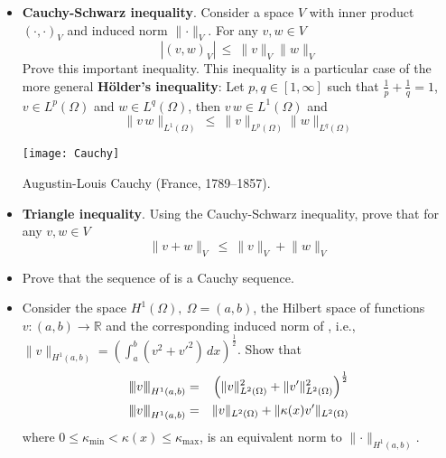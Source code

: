 \begin{kaobox}[frametitle=Solve the following exercices]
\begin{itemize}
\item \textbf{Cauchy-Schwarz inequality}. Consider a space $V$ with inner product 
$(\cdot,\cdot)_V$ and induced norm $\parallel \cdot \parallel_V$.
For any $v,w \in V$
\begin{equation}
|(v,w)_V| \, \le ~ \lVert v \rVert_V \lVert w \rVert_V
\end{equation}
Prove this important inequality. This inequality is a particular case
of the more general \textbf{H\"older's inequality}: Let $p,q \in [1,\infty]$
such that $\frac{1}{p} + \frac{1}{q} = 1$,
$v \in L^p(\Omega)$ and $w \in L^q(\Omega)$, then $v\,w \in L^1(\Omega)$
and
\begin{equation}
\lVert v\,w \rVert_{L^1(\Omega)} \, \le ~ \lVert v \rVert_{L^p(\Omega)} \lVert w \rVert_{L^q(\Omega)}
\end{equation} 
\begin{marginfigure}[-5.0cm]
       \texttt{[image: Cauchy]}
       \caption[]{Augustin-Louis Cauchy (France, 1789--1857).} 
\end{marginfigure}

\item \textbf{Triangle inequality}. Using the Cauchy-Schwarz inequality,
prove that for any $v,w \in V$
\begin{equation}
\lVert v + w \rVert_V ~ \le ~ \lVert v \rVert_V + \lVert w \rVert_V
\end{equation}

\item Prove that the sequence of  is a Cauchy sequence.\\

\item Consider the space $H^1(\Omega),~\Omega = (a,b)$, the Hilbert space
of functions $v: (a,b) \rightarrow \mathbb{R}$ and the corresponding induced
norm of , i.e., $\lVert v \rVert_{H^1(a,b)} = \left ( \int_a^b{(v^2 + v'^2)}\,dx\right )^{\frac12}$.
Show that
\begin{eqnarray}
{\left\vert\kern-0.25ex\left\vert\kern-0.25ex\left\vert v \right\vert\kern-0.25ex\right\vert\kern-0.25ex\right\vert}_{H^1(a,b)} & = & \left ( \lVert v \rVert_{L^2(\Omega)}^2 + \lVert v' \rVert_{L^2(\Omega)}^2 \right )^{\frac12} \nonumber \\
{\left\vert\kern-0.25ex\left\vert\kern-0.25ex\left\vert v \right\vert\kern-0.25ex\right\vert\kern-0.25ex\right\vert}_{H^1(a,b)} & = & \lVert v \rVert_{L^2(\Omega)} + \lVert \kappa(x) v' \rVert_{L^2(\Omega)} \nonumber
\end{eqnarray}
where $0\le \kappa_{\min} < \kappa(x) \le \kappa_{\max}$,
is an equivalent norm to $\parallel \cdot \parallel_{H^1(a,b)}$. \\


\end{itemize}
\end{kaobox}
